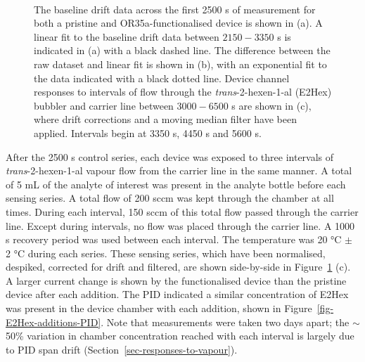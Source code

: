 \documentclass[
  a4paper,
]{scrbook}
\begin{document}
\begin{figure}
\begin{minipage}[t]{0.75\linewidth}
{{}

}

\end{minipage}%
%
\begin{minipage}[t]{0.10\linewidth}

{\centering 

~

}

\end{minipage}%

\caption[The baseline drift data for both a pristine and
OR35a-functionalised device with a linear fitted curve shown, alongside
the same dataset with linear fit subtracted and an exponential curve
fitted. Device channel responses to \emph{trans}-2-hexen-1-al (E2Hex),
filtered and with drift corrections, are also
shown.]{\label{fig-E2Hex-sampling}The baseline drift data across the
first 2500 s of measurement for both a pristine and OR35a-functionalised
device is shown in (a). A linear fit to the baseline drift data between
\(2150-3350\) s is indicated in (a) with a black dashed line. The
difference between the raw dataset and linear fit is shown in (b), with
an exponential fit to the data indicated with a black dotted line.
Device channel responses to intervals of flow through the
\emph{trans}-2-hexen-1-al (E2Hex) bubbler and carrier line between
\(3000-6500\) s are shown in (c), where drift corrections and a moving
median filter have been applied. Intervals begin at 3350 s, 4450 s and
5600 s.}

\end{figure}

After the 2500 s control series, each device was exposed to three
intervals of \emph{trans}-2-hexen-1-al vapour flow from the carrier line
in the same manner. A total of 5 mL of the analyte of interest was
present in the analyte bottle before each sensing series. A total flow
of 200 sccm was kept through the chamber at all times. During each
interval, 150 sccm of this total flow passed through the carrier line.
Except during intervals, no flow was placed through the carrier line. A
1000 s recovery period was used between each interval. The temperature
was 20 °C \(\pm\) 2 °C during each series. These sensing series, which
have been normalised, despiked, corrected for drift and filtered, are
shown side-by-side in Figure~\ref{fig-E2Hex-sampling} (c). A larger
current change is shown by the functionalised device than the pristine
device after each addition. The PID indicated a similar concentration of
E2Hex was present in the device chamber with each addition, shown in
Figure~\ref{fig-E2Hex-additions-PID}. Note that measurements were taken
two days apart; the \(\sim\) 50\% variation in chamber concentration
reached with each interval is largely due to PID span drift
(Section~\ref{sec-responses-to-vapour}).
\end{document}
